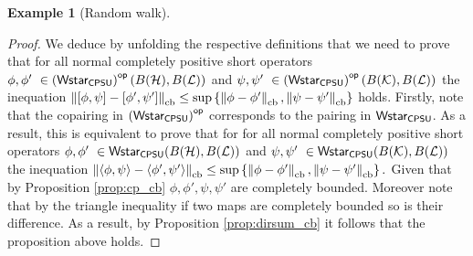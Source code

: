 \documentclass[10pt,a4paper]{amsart}
\theoremstyle{definition}
\theoremstyle{definition}
\newtheorem{example}[definition]{Example}
\theoremstyle{definition}
\theoremstyle{definition}
\theoremstyle{definition}
\theoremstyle{definition}
\begin{document}
\begin{example}[Random walk]
\begin{proof}
  We deduce by unfolding the respective definitions that we need to prove that for all normal completely positive short operators $\phi, \phi' \in \WstarCPSUop(B(\mathcal{H}),B(\mathcal{L}))  $ and $\psi, \psi' \in \WstarCPSUop(B(\mathcal{K}),B(\mathcal{L}))$ the inequation $\left\lVert [\phi, \psi] - [\phi', \psi'] \right\rVert_{\text{cb}} \leq  \sup \left\{ \left\lVert \phi-\phi' \right\rVert_{\text{cb}}, \left\lVert \psi-\psi' \right\rVert_{\text{cb}} \right\}$ holds.
  Firstly, note that the copairing in $\left(\mathsf{Wstar_{CPSU}}\right)^{\mathsf{op}}$ corresponds to the pairing in $\mathsf{Wstar_{CPSU}}$. As a result, this is equivalent to prove that for for all normal completely positive short operators $\phi, \phi' \in \WstarCPSU(B(\mathcal{H}),B(\mathcal{L}))  $ and $\psi, \psi' \in \WstarCPSU(B(\mathcal{K}),B(\mathcal{L}))$ the inequation $\left\lVert \langle \phi, \psi \rangle - \langle \phi', \psi'\rangle \right\rVert_{\text{cb}} \leq  \sup \left\{ \left\lVert \phi-\phi' \right\rVert_{\text{cb}}, \left\lVert \psi-\psi' \right\rVert_{\text{cb}} \right\}.$ Given that by Proposition \ref{prop:cp_cb} $\phi, \phi', \psi, \psi'$ are completely bounded. Moreover note that by the triangle inequality if two maps are completely bounded so is their difference. As a result, by Proposition \ref{prop:dirsum_cb} it follows that the proposition above holds.
  
\end{proof}














  \end{example}
  



\newpage
 

\end{document}
